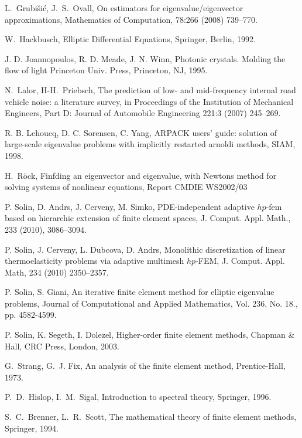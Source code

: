 \documentclass[smallextended]{svjour3}
\begin{document}
\begin{thebibliography}{10}
{\sc L.~Grubi\v{s}i\'c, J.~S.~Ovall},
{ On estimators for eigenvalue/eigenvector approximations},
{ Mathematics of Computation}, 78:266 (2008)  739--770.

{\sc W.~Hackbusch,}
 { Elliptic Differential Equations},
 Springer, Berlin, 1992.

{\sc J. D. Joannopoulos, R. D. Meade,  J. N. Winn, }
{ Photonic crystals. Molding the flow of light} 
{Princeton
Univ. Press, Princeton, NJ}, 1995.

{\sc N.~Lalor, H-H.~Priebsch,}
	 { The prediction of low- and mid-frequency internal road vehicle noise: a literature survey},
	{in Proceedings of the Institution of Mechanical Engineers, Part D: Journal of Automobile Engineering} 
	221:3 (2007)  245--269.

{\sc R. B. Lehoucq, D. C. Sorensen, C. Yang, }
{ ARPACK
users' guide: solution of large-scale eigenvalue problems with
implicitly restarted arnoldi methods},  {SIAM, 1998}.

{\sc H.~R\"{o}ck,}
{ Finfding an eigenvector and eigenvalue, with Newtons method for solving systems of nonlinear equations},
{Report CMDIE WS2002/03}

{\sc P. Solin, D. Andrs, J. Cerveny, M. Simko,}
{ PDE-independent adaptive $hp$-fem based on hierarchic extension of finite element spaces},
{J. Comput. Appl. Math.}, 233 (2010),  3086--3094.

{\sc P. Solin, J. Cerveny, L. Dubcova, D. Andrs,}
{ Monolithic discretization of linear 
thermoelasticity problems via adaptive multimesh $hp$-FEM}, 
{J. Comput. Appl. Math},
234 (2010)  2350--2357.

{\sc P. Solin, S. Giani,} 
{An iterative finite element method for elliptic eigenvalue problems}, 
Journal of Computational and Applied Mathematics, Vol. 236, No. 18., pp. 4582-4599.

{\sc P. Solin, K. Segeth, I. Dolezel,}
{ Higher-order finite element methods},
Chapman \& Hall, CRC Press, London, 2003.

{\sc G.~Strang, G.~J. Fix},
 { An analysis of the finite element method},
 Prentice-Hall, 1973.
 
{\sc P.~D.~Hislop, I.~M.~Sigal},
 { Introduction to spectral theory},
 Springer, 1996.
 
{\sc S.~C.~Brenner, L.~R.~Scott},
 { The mathematical theory of finite element methods},
 Springer, 1994.

\end{thebibliography} 
\end{document}
